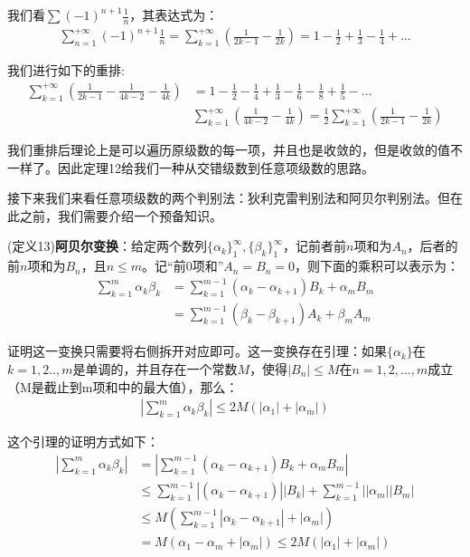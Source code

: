 \documentclass{ctexart}
\let\oldtextbf\textbf
\renewcommand{\textbf}[1]{\textcolor{brown!50!red}{\oldtextbf{#1}}}
\begin{document}
我们看$\sum (-1)^{n+1} \frac{1}{n}$，其表达式为：
\begin{align*}
    \sum_{n=1}^{+\infty}(-1)^{n+1}\frac{1}{n}=\sum_{k=1}^{+\infty}(\frac{1}{2k-1}-\frac{1}{2k})=1-\frac{1}{2}+\frac{1}{3}-\frac{1}{4}+...
\end{align*}

我们进行如下的重排:
\begin{align*}
    \sum_{k=1}^{+\infty}(\frac{1}{2k-1}-\frac{1}{4k-2}-\frac{1}{4k})&=1-\frac{1}{2}-\frac{1}{4}+\frac{1}{3}-\frac{1}{6}-\frac{1}{8}+\frac{1}{5}-...\\
    &\sum_{k=1}^{+\infty}(\frac{1}{4k-2}-\frac{1}{4k})=\frac{1}{2}\sum_{k=1}^{+\infty}(\frac{1}{2k-1}-\frac{1}{2k})
\end{align*}

我们重排后理论上是可以遍历原级数的每一项，并且也是收敛的，但是收敛的值不一样了。因此定理12给我们一种从交错级数到任意项级数的思路。

接下来我们来看任意项级数的两个判别法：狄利克雷判别法和阿贝尔判别法。但在此之前，我们需要介绍一个预备知识。
\begin{tcolorbox}[
    colback=bac1,     %
    colframe=fra1,   %
    coltitle=white!80,    
    coltext=tex1,%
    title=阿贝尔变换,
    fonttitle=\bfseries,        %
arc=2mm,                     %
breakable
]
(定义13)\textbf{\color{brown!50!red}阿贝尔变换}：给定两个数列$\{\alpha_k\}_1^\infty,\{\beta_k\}_1^\infty$，记前者前$n$项和为$A_n$，后者的前$n$项和为$B_n$，且$n\leq m$。记“前0项和”$A_n=B_n=0$，则下面的乘积可以表示为：
\begin{align*} 
  \sum_{k=1}^m \alpha_k\beta_k&=\sum_{k=1}^{m-1}(\alpha_k-\alpha_{k+1})B_k+\alpha_mB_m\\
&=\sum_{k=1}^{m-1}(\beta_k-\beta_{k+1})A_k+\beta_mA_m
\end{align*}
\end{tcolorbox}

证明这一变换只需要将右侧拆开对应即可。这一变换存在引理：如果$\{\alpha_k\}$在$k=1,2..,m$是单调的，并且存在一个常数$M$，使得$|B_n|\leq M$在$n=1,2,...,m$成立（M是截止到m项和中的最大值），那么：
\begin{align*} 
  |\sum_{k=1}^m \alpha_k\beta_k|\leq 2M(|\alpha_1|+|\alpha_m|)
\end{align*}

这个引理的证明方式如下：
\begin{align*} 
 |\sum_{k=1}^m \alpha_k\beta_k|&=|\sum_{k=1}^{m-1}(\alpha_k-\alpha_{k+1})B_k+\alpha_mB_m|\\
&\leq\sum_{k=1}^{m-1}|(\alpha_k-\alpha_{k+1})||B_k|+\sum_{k=1}^{m-1}||\alpha_m||B_m|\\
&\leq M(\sum_{k=1}^{m-1}|\alpha_k-\alpha_{k+1}|+|\alpha_m|)\\
&=M(\alpha_1-\alpha_m+|\alpha_m|)\leq2M(|\alpha_1|+|\alpha_m|)
\end{align*}
\end{document}
